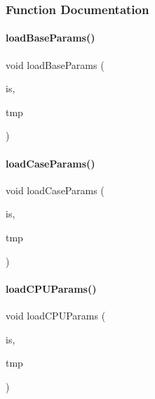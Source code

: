 \subsubsection{Function Documentation}
\mbox{\label{_inventory_8cpp_af88785d286c8ea9392930b904f687672}} 
\paragraph{\texorpdfstring{loadBaseParams()}{loadBaseParams()}}
{\footnotesize\ttfamily void load\+Base\+Params (\begin{DoxyParamCaption}\item[{std\+::istream \&}]{is,  }\item[{\mbox{\hyperlink{struct_temp_input}{Temp\+Input}} \&}]{tmp }\end{DoxyParamCaption})}

\mbox{\label{_inventory_8cpp_a47e65a05879001febd45f541ab230b86}} 
\paragraph{\texorpdfstring{loadCaseParams()}{loadCaseParams()}}
{\footnotesize\ttfamily void load\+Case\+Params (\begin{DoxyParamCaption}\item[{std\+::istream \&}]{is,  }\item[{\mbox{\hyperlink{struct_temp_input}{Temp\+Input}} \&}]{tmp }\end{DoxyParamCaption})}

\mbox{\label{_inventory_8cpp_a0565beb9b5429fe7cf6edcb88becc168}} 
\paragraph{\texorpdfstring{loadCPUParams()}{loadCPUParams()}}
{\footnotesize\ttfamily void load\+C\+P\+U\+Params (\begin{DoxyParamCaption}\item[{std\+::istream \&}]{is,  }\item[{\mbox{\hyperlink{struct_temp_input}{Temp\+Input}} \&}]{tmp }\end{DoxyParamCaption})}

